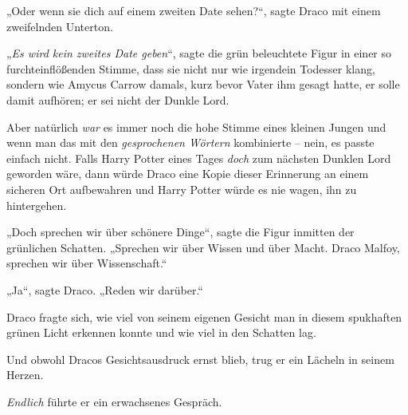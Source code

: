 „Oder wenn sie dich auf einem zweiten Date sehen?“, sagte Draco mit einem zweifelnden Unterton.

„\emph{Es wird kein zweites Date geben}“, sagte die grün beleuchtete Figur in einer so furchteinflößenden Stimme, dass sie nicht nur wie irgendein Todesser klang, sondern wie Amycus Carrow damals, kurz bevor Vater ihm gesagt hatte, er solle damit aufhören; er sei nicht der Dunkle Lord.

Aber natürlich \emph{war} es immer noch die hohe Stimme eines kleinen Jungen und wenn man das mit den \emph{gesprochenen Wörtern} kombinierte – nein, es passte einfach nicht. Falls Harry Potter eines Tages \emph{doch} zum nächsten Dunklen Lord geworden wäre, dann würde Draco eine Kopie dieser Erinnerung an einem sicheren Ort aufbewahren und Harry Potter würde es nie wagen, ihn zu hintergehen.

„Doch sprechen wir über schönere Dinge“, sagte die Figur inmitten der grünlichen Schatten. „Sprechen wir über Wissen und über Macht. Draco Malfoy, sprechen wir über Wissenschaft.“

„Ja“, sagte Draco. „Reden wir darüber.“

Draco fragte sich, wie viel von seinem eigenen Gesicht man in diesem spukhaften grünen Licht erkennen konnte und wie viel in den Schatten lag.

Und obwohl Dracos Gesichtsausdruck ernst blieb, trug er ein Lächeln in seinem Herzen.

\emph{Endlich} führte er ein erwachsenes Gespräch.


